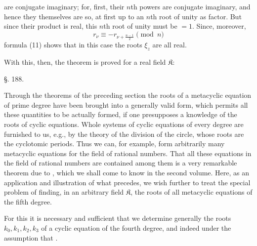 are conjugate imaginary; for, first, their $n$th powers are conjugate
imaginary, and hence they themselves are so, at first up to an $n$th root of unity as
factor. But since their product is real, this $n$th root of unity
must be $= 1$. Since, moreover,
\[
r_\nu \equiv - r_{\nu + \frac{n-1}{2}} \pmod{n}
\]
formula (11) shows that in this case the roots $\xi_z$ are all real.

With this, then, the theorem is proved for a real field $\mathfrak{K}$:


\begin{center}
§. 188.

\end{center}

Through the theorems of the preceding section the roots of a metacyclic
equation of prime degree have been brought into a generally valid form, which permits
all these quantities to be actually formed, if one presupposes a knowledge of the roots of cyclic
equations. Whole systems of cyclic equations of every degree are furnished to us,
e.g., by the theory of the division of the circle, whose roots are the cyclotomic periods. Thus
we can, for example, form arbitrarily many
metacyclic equations for the field of rational numbers. That all these equations in the field of
rational numbers are contained among them is a very remarkable theorem due to ,
which we shall come to know in the second volume. Here, as an
application and illustration of what precedes, we wish further to treat the special problem
of finding, in an arbitrary field $\mathfrak{K}$, the roots of all metacyclic
equations of the fifth degree.

For this it is necessary and sufficient that we determine generally the roots $k_0, k_1, k_2, k_3$ of a
cyclic equation of the fourth degree, and indeed under the
assumption that .
